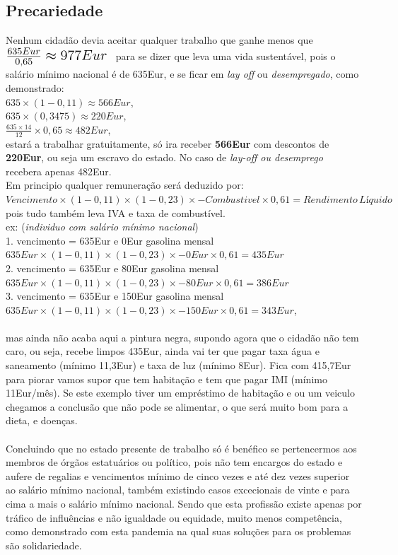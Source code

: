 \subsection{Precariedade}
\qquad Nenhum cidadão devia aceitar qualquer trabalho que ganhe menos que \; $ \mbox{\Large $ \frac{635Eur}{0,65}\approx 977Eur $ } $ para se dizer que leva uma vida sustentável, pois o salário mínimo nacional é de 635Eur, e se ficar em \textit{lay off} ou \textit{desempregado}, como demonstrado:\\
$635\times(1-0,11)\approx566Eur$,\\
$635\times(0,3475)\approx220Eur$,\\
$\frac{635\times14}{12}\times0,65 \approx 482Eur$, \\
estará a trabalhar gratuitamente, só ira receber \textbf{566Eur} com descontos de \textbf{220Eur}, ou seja um escravo do estado. No caso de \textit{lay-off ou desemprego} recebera apenas 482Eur.\\
Em principio qualquer remuneração será deduzido por: $Vencimento \times (1-0,11) \times (1-0,23) \times - Combustivel\times 0,61 = Rendimento \, Líquido$ pois tudo também leva IVA e taxa de combustível.\\
ex: (\textit{individuo com salário mínimo nacional})\\
1. vencimento = 635Eur e 0Eur gasolina mensal \\
\hspace*{1cm} $635Eur \times (1-0,11) \times (1-0,23) \times - 0Eur \times 0,61 = 435Eur$ \\
2. vencimento = 635Eur e 80Eur gasolina mensal \\
\hspace*{1cm} $635Eur \times (1-0,11) \times (1-0,23) \times - 80Eur \times 0,61 = 386Eur$ \\
3. vencimento = 635Eur e 150Eur gasolina mensal \\
\hspace*{1cm} $635Eur \times (1-0,11) \times (1-0,23) \times - 150Eur \times 0,61 = 343Eur$, \\ \\
mas ainda não acaba aqui a pintura negra, supondo agora que o cidadão não tem caro, ou seja, recebe limpos 435Eur, ainda vai ter que pagar taxa água e saneamento (mínimo 11,3Eur) e taxa de luz (mínimo 8Eur). Fica com 415,7Eur para piorar vamos supor que tem habitação e tem que pagar IMI (mínimo 11Eur/mês).
Se este exemplo tiver um empréstimo de habitação e ou um veiculo chegamos a conclusão que não pode se alimentar, o que será muito bom para a dieta, e doenças.\\
\\
Concluindo que no estado presente de trabalho só é benéfico se pertencermos aos membros de órgãos estatuários ou político, pois não tem encargos do estado e aufere de regalias e vencimentos mínimo de cinco vezes e até dez vezes superior ao salário mínimo nacional, também existindo casos excecionais de vinte e para cima a mais o salário mínimo nacional. Sendo que esta profissão existe apenas por tráfico de influências e não igualdade ou equidade, muito menos competência, como demonstrado com esta pandemia na qual suas soluções para os problemas são solidariedade.

